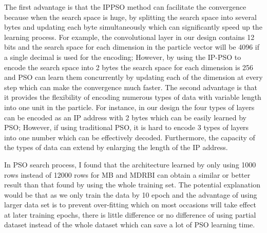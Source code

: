 \documentclass[conference]{IEEEtran}
\begin{document}
The first advantage is that the IPPSO method can facilitate the convergence because when the search space is huge, by splitting the search space into several bytes and updating each byte simultaneously which can significantly speed up the learning process. For example, the convolutional layer in our design contains 12 bits and the search space for each dimension in the particle vector will be 4096 if a single decimal is used for the encoding; However, by using the IP-PSO to encode the search space into 2 bytes the search space for each dimension is 256 and PSO can learn them concurrently by updating each of the dimension at every step which can make the convergence much faster. 
The second advantage is that it provides the flexibility of encoding numerous types of data with variable length into one unit in the particle. For instance, in our design the four types of layers can be encoded as an IP address with 2 bytes which can be easily learned by PSO; However, if using traditional PSO, it is hard to encode 3 types of layers into one number which can be effectively decoded. Furthermore, the capacity of the types of data can extend by enlarging the length of the IP address.

In PSO search process, I found that the architecture learned by only using 1000 rows instead of 12000 rows for MB and MDRBI can obtain a similar or better result than that found by using the whole training set. The potential explanation would be that as we only train the data by 10 epoch and the advantage of using larger data set is to prevent over-fitting which on most occasions will take effect at later training epochs, there is little difference or no difference of using partial dataset instead of the whole dataset which can save a lot of PSO learning time.

%
%
\end{document}
